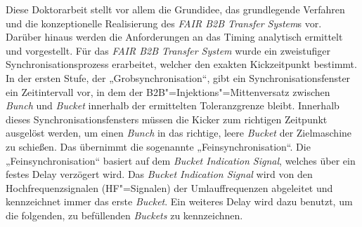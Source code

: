 Diese Doktorarbeit stellt vor allem die Grundidee, das grundlegende Verfahren und die konzeptionelle Realisierung des \textit{FAIR B2B Transfer System}s vor. Darüber hinaus werden die Anforderungen an das Timing analytisch ermittelt und vorgestellt. F\"ur das \textit{FAIR B2B Transfer System} wurde ein zweistufiger Synchronisationsprozess erarbeitet, welcher den exakten Kickzeitpunkt bestimmt. In der ersten Stufe, der „Grobsynchronisation“, gibt ein Synchronisationsfenster ein Zeitintervall vor, in dem der B2B"=Injektions"=Mittenversatz zwischen \textit{Bunch} und \textit{Bucket} innerhalb der ermittelten Toleranzgrenze bleibt. Innerhalb dieses Synchronisationsfensters m\"ussen die Kicker zum richtigen Zeitpunkt ausgel\"ost werden, um einen \textit{Bunch} in das richtige, leere \textit{Bucket} der Zielmaschine zu schie\ss{}en. Das \"ubernimmt die sogenannte „Feinsynchronisation“.
Die „Feinsynchronisation“ basiert auf dem \textit{Bucket Indication Signal}, welches \"uber ein festes Delay verz\"ogert wird. Das \textit{Bucket Indication Signal} wird von den Hochfrequenzsignalen (HF"=Signalen) der Umlauffrequenzen abgeleitet und kennzeichnet immer das erste \textit{Bucket}. Ein weiteres Delay wird dazu benutzt, um die folgenden, zu bef\"ullenden \textit{Buckets} zu kennzeichnen. 

